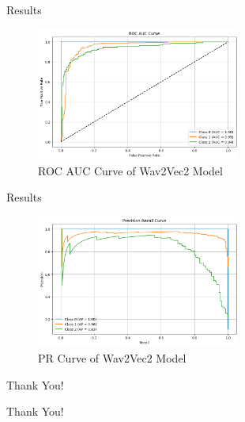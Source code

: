 \documentclass{beamer}
\begin{document}
\begin{frame}{Results}
    
    \begin{figure}
        \centering
        \includegraphics[width=0.6\textwidth]{wav4.png}
        \caption{ROC AUC Curve of Wav2Vec2 Model}
    \end{figure}

\end{frame}

\begin{frame}{Results}
    
    \begin{figure}
        \centering
        \includegraphics[width=0.6\textwidth]{wav5.png}
        \caption{PR Curve of Wav2Vec2 Model}
    \end{figure}

\end{frame}

\begin{frame}{Thank You!}
    \begin{center}
        \Huge Thank You! 
    \end{center}
\end{frame}
\end{document}
